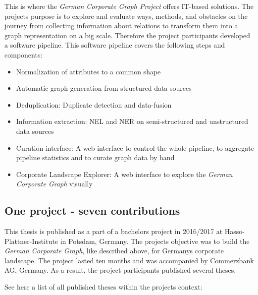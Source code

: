 This is where the \emph{German Corporate Graph Project} offers IT-based solutions. The project\grq s purpose is to explore and evaluate ways, methods, and obstacles on the journey from collecting information about relations to transform them into a graph representation on a big scale. Therefore the project participants developed a software pipeline. 
\newpage
This software pipeline covers the following steps and components:
\begin{itemize}
\item Normalization of attributes to a common shape
\item Automatic graph generation from structured data sources
\item Deduplication: Duplicate detection and data-fusion 
\item Information extraction: NEL and NER on semi-structured and unstructured data sources
\item Curation interface: A web interface to control the whole pipeline, to aggregate pipeline statistics and to curate graph data by hand
\item Corporate Landscape Explorer: A web interface to explore the \emph{German Corporate Graph} visually   
\end{itemize}


\subsection{One project - seven contributions}

This thesis is published as a part of a bachelor\grq s project in 2016/2017 at Hasso-Plattner-Institute in Potsdam, Germany. The project\grq s objective was to build the \emph {German Corporate Graph}, like described above, for Germany\grq s corporate landscape. The project lasted ten months and was accompanied by Commerzbank AG, Germany. As a result, the project participants published several theses. 



See here a list of all published theses within the project\grq s context:

